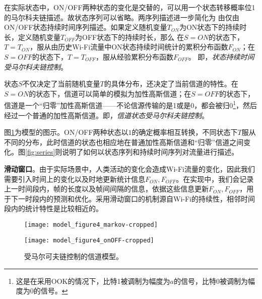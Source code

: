 在实际状态中，ON/OFF两种状态的变化是交替的，可以用一个状态转移概率位1的马尔科夫链描述。故状态序列可以省略。两序列描述进一步简化为
由仅由ON/OFF状态持续时间序列描述。如果定义随机变量$T_{ON}$为ON状态下的持续时长，定义随机变量$T_{OFF}$为OFF状态下的持续时长，那么
在$S = ON$的状态下，$T = T_{ON}$，服从由历史Wi-Fi流量中ON状态持续时间统计的累积分布函数$F_{ON}$；在$S = OFF$的状态下，$T = T_{OFF}$，服从经验累积分布函数$F_{OFF}$。
即，\emph{状态持续时间受马尔科夫链控制}。

状态$S$不仅决定了当前随机变量$T$的具体分布，还决定了当前信道的特性。在$S = ON$的状态下，信道可以简单的模拟为加性高斯信道；在$S = OFF$的状态下，信道是一个“归零”加性高斯信道——不论信源传输的是1或是0，都会被归0\footnote{这是在采用OOK的情况下，比特1被调制为幅度为$a$的信号，比特0被调制为幅度为0的信号。}，然后经过一个普通的加性高斯信道。即，\emph{信道状态受马尔科夫链控制}。

图\ref{fig:markov_model}为模型的图示。ON/OFF两种状态以$1$的确定概率相互转换，不同状态下$T$服从不同的分布，此时信道的状态也相应地在普通加性高斯信道和“归零”信道之间变化。图\ref{fig:series}则说明了如何以状态序列和持续时间序列对流量进行描述。

\textbf{滑动窗口}。由于实际场景中，人类活动的变化会造成Wi-Fi流量的变化，因此我们需要引入时间上的变化以及时地更新统计信息$F_{ON},F_{OFF}$。在实现中，我们会记录上一时间段内，帧的长度以及帧间间隔的信息，依据这些信息更新$F_{ON},F_{OFF}$，用于下一时段内的预测和优化。采用滑动窗口的机制源自Wi-Fi的持续性，相邻时间段内的统计特性是比较相近的。
\begin{figure}[t]
	\begin{minipage}[b]{.5\linewidth}
		\texttt{[image: model\_figure4\_markov-cropped]}
		\label{fig:markov_chain}
	\end{minipage}
	\hfill
	\begin{minipage}[b]{.5\linewidth}
		\texttt{[image: model\_figure4\_onOFF-cropped]}
		\label{fig:series}
	\end{minipage}
	\caption{受马尔可夫链控制的信道模型。}\label{fig:markov_model}
\end{figure}